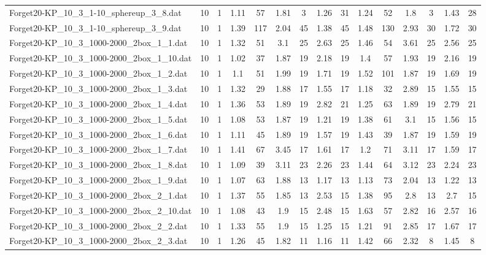 \begin{table}[!ht]
{\begin{tabular}{lcccccccccccccc}
Forget20-KP\_10\_3\_1-10\_sphereup\_3\_8.dat & 10 & 1 & 1.11 & 57 & 1.81 & 3 & 1.26 & 31 & 1.24 & 52 & 1.8 & 3 & 1.43 & 28 \\
Forget20-KP\_10\_3\_1-10\_sphereup\_3\_9.dat & 10 & 1 & 1.39 & 117 & 2.04 & 45 & 1.38 & 45 & 1.48 & 130 & 2.93 & 30 & 1.72 & 30 \\
Forget20-KP\_10\_3\_1000-2000\_2box\_1\_1.dat & 10 & 1 & 1.32 & 51 & 3.1 & 25 & 2.63 & 25 & 1.46 & 54 & 3.61 & 25 & 2.56 & 25 \\
Forget20-KP\_10\_3\_1000-2000\_2box\_1\_10.dat & 10 & 1 & 1.02 & 37 & 1.87 & 19 & 2.18 & 19 & 1.4 & 57 & 1.93 & 19 & 2.16 & 19 \\
Forget20-KP\_10\_3\_1000-2000\_2box\_1\_2.dat & 10 & 1 & 1.1 & 51 & 1.99 & 19 & 1.71 & 19 & 1.52 & 101 & 1.87 & 19 & 1.69 & 19 \\
Forget20-KP\_10\_3\_1000-2000\_2box\_1\_3.dat & 10 & 1 & 1.32 & 29 & 1.88 & 17 & 1.55 & 17 & 1.18 & 32 & 2.89 & 15 & 1.55 & 15 \\
Forget20-KP\_10\_3\_1000-2000\_2box\_1\_4.dat & 10 & 1 & 1.36 & 53 & 1.89 & 19 & 2.82 & 21 & 1.25 & 63 & 1.89 & 19 & 2.79 & 21 \\
Forget20-KP\_10\_3\_1000-2000\_2box\_1\_5.dat & 10 & 1 & 1.08 & 53 & 1.87 & 19 & 1.21 & 19 & 1.38 & 61 & 3.1 & 15 & 1.56 & 15 \\
Forget20-KP\_10\_3\_1000-2000\_2box\_1\_6.dat & 10 & 1 & 1.11 & 45 & 1.89 & 19 & 1.57 & 19 & 1.43 & 39 & 1.87 & 19 & 1.59 & 19 \\
Forget20-KP\_10\_3\_1000-2000\_2box\_1\_7.dat & 10 & 1 & 1.41 & 67 & 3.45 & 17 & 1.61 & 17 & 1.2 & 71 & 3.11 & 17 & 1.59 & 17 \\
Forget20-KP\_10\_3\_1000-2000\_2box\_1\_8.dat & 10 & 1 & 1.09 & 39 & 3.11 & 23 & 2.26 & 23 & 1.44 & 64 & 3.12 & 23 & 2.24 & 23 \\
Forget20-KP\_10\_3\_1000-2000\_2box\_1\_9.dat & 10 & 1 & 1.07 & 63 & 1.88 & 13 & 1.17 & 13 & 1.13 & 73 & 2.04 & 13 & 1.22 & 13 \\
Forget20-KP\_10\_3\_1000-2000\_2box\_2\_1.dat & 10 & 1 & 1.37 & 55 & 1.85 & 13 & 2.53 & 15 & 1.38 & 95 & 2.8 & 13 & 2.7 & 15 \\
Forget20-KP\_10\_3\_1000-2000\_2box\_2\_10.dat & 10 & 1 & 1.08 & 43 & 1.9 & 15 & 2.48 & 15 & 1.63 & 57 & 2.82 & 16 & 2.57 & 16 \\
Forget20-KP\_10\_3\_1000-2000\_2box\_2\_2.dat & 10 & 1 & 1.33 & 55 & 1.9 & 15 & 1.25 & 15 & 1.21 & 91 & 2.85 & 17 & 1.67 & 17 \\
Forget20-KP\_10\_3\_1000-2000\_2box\_2\_3.dat & 10 & 1 & 1.26 & 45 & 1.82 & 11 & 1.16 & 11 & 1.42 & 66 & 2.32 & 8 & 1.45 & 8 \\

\end{tabular}}
\end{table}
